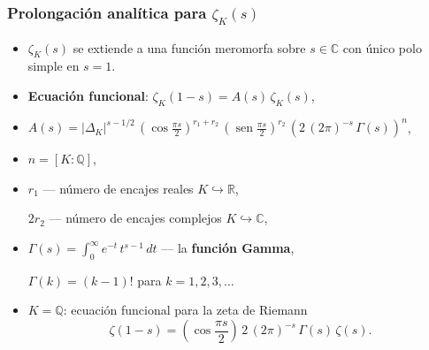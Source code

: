 \documentclass{beamer}
\newcommand{\QQ}{\mathbb{Q}}
\newcommand{\CC}{\mathbb{C}}
\newcommand{\RR}{\mathbb{R}}
\renewcommand{\sin}{\operatorname{sen}}
\begin{document}

\begin{frame}
  \frametitle{Prolongación analítica para $\zeta_K (s)$}

  \begin{itemize}
  \item<1-> $\zeta_K (s)$ se extiende a una función meromorfa sobre $s \in \CC$ con
    único polo simple en $s = 1$.

  \item<2-> \textbf{Ecuación funcional}: $\zeta_K (1-s) = A(s)\,\zeta_K (s)$,

  \item<3-> $A (s) = |\Delta_K|^{s - 1/2}\,\left(\cos\frac{\pi s}{2}\right)^{r_1+r_2}\,\left(\sin\frac{\pi s}{2}\right)^{r_2}\,\left(2\,(2\pi)^{-s}\,\Gamma (s)\right)^n$,

  \item<4-> $n = [K : \QQ]$,

  \item<5-> $r_1$ --- número de encajes reales $K \hookrightarrow \RR$,

    $2 r_2$ --- número de encajes complejos $K \hookrightarrow \CC$,

  \item<6-> $\Gamma (s) = \int_0^\infty e^{-t}\,t^{s-1}\,dt$ --- la \textbf{función Gamma},

    $\Gamma (k) = (k-1)!$ para $k = 1,2,3,\ldots$
    
  \item<7-> $K = \QQ$: ecuación funcional para la zeta de Riemann
    $$\zeta (1-s) = \left(\cos\frac{\pi s}{2}\right)\,2\,(2\pi)^{-s}\,\Gamma (s)\,\zeta (s).$$
  \end{itemize}
\end{frame}

\end{document}
